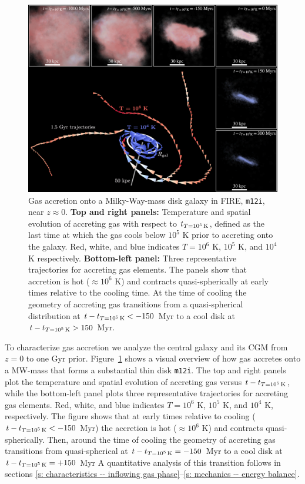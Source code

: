 \documentclass[fleqn,usenatbib]{mnras}
\newcommand{\tcon}{t_{T=10^5\,{\rm K}}}
\begin{document}
\begin{figure}
    \centering
    \includegraphics[width=\textwidth]{figures/illustrative_tracks/illustrative_tracks.png}
    \caption{
Gas accretion onto a Milky-Way-mass disk galaxy in FIRE, \texttt{m12i}, near $z\approx0$.
\textbf{Top and right panels:}
Temperature and spatial evolution of accreting gas with respect to $\tcon$, defined as the last time at which the gas cools below $10^5$ K prior to accreting onto the galaxy.
Red, white, and blue indicates $T=10^6$ K, $10^5$ K, and $10^4$ K respectively. 
\textbf{Bottom-left panel:}
Three representative trajectories for accreting gas elements.
The panels show that accretion is hot ($\approx 10^6$ K) and contracts quasi-spherically at early times relative to the cooling time.
At the time of cooling the geometry of accreting gas transitions from a quasi-spherical distribution at $t-\tcon < -150$ Myr to a cool disk at $t-\tcon > 150$ Myr.
    }
    \label{f: overview}
\end{figure}

To characterize gas accretion we analyze the central galaxy and its CGM from $z=0$ to one Gyr prior.
Figure~\ref{f: overview} shows a visual overview of how gas accretes onto a MW-mass that forms a substantial thin disk \texttt{m12i}. 
The top and right panels plot the temperature and spatial evolution of accreting gas versus $t-\tcon$, while the bottom-left panel plots three representative trajectories for accreting gas elements. 
Red, white, and blue indicates $T=10^6$ K, $10^5$ K, and $10^4$ K, respectively.
The figure shows that at early times relative to cooling ($t-\tcon<-150$ Myr) the accretion is hot ($\approx10^6$ K) and contracts quasi-spherically.
Then, around the time of cooling the geometry of accreting gas transitions from quasi-spherical at $t - \tcon=-150$ Myr to a cool disk at $t - \tcon=+ 150$ Myr
A quantitative analysis of this transition follows in sections \ref{s: characteristics -- inflowing gas phase}--\ref{s: mechanics -- energy balance}.
\end{document}
